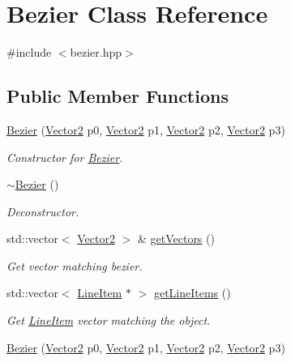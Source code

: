 \hypertarget{classBezier}{}\section{Bezier Class Reference}
\label{classBezier}


{\ttfamily \#include $<$bezier.\+hpp$>$}

\subsection*{Public Member Functions}
\begin{DoxyCompactItemize}
\item 
\mbox{\hyperlink{classBezier_aeee0e41ed64d1a61d7ac103d2300093b}{Bezier}} (\mbox{\hyperlink{classVector2}{Vector2}} p0, \mbox{\hyperlink{classVector2}{Vector2}} p1, \mbox{\hyperlink{classVector2}{Vector2}} p2, \mbox{\hyperlink{classVector2}{Vector2}} p3)
\begin{DoxyCompactList}\small\item\em Constructor for \mbox{\hyperlink{classBezier}{Bezier}}. \end{DoxyCompactList}\item 
\mbox{\hyperlink{classBezier_a32f81ea72bd31a4607b4168839ea8815}{$\sim$\+Bezier}} ()
\begin{DoxyCompactList}\small\item\em Deconstructor. \end{DoxyCompactList}\item 
std\+::vector$<$ \mbox{\hyperlink{classVector2}{Vector2}} $>$ \& \mbox{\hyperlink{classBezier_a26bf332b0c831e0f302f1d72ec782436}{get\+Vectors}} ()
\begin{DoxyCompactList}\small\item\em Get vector matching bezier. \end{DoxyCompactList}\item 
\mbox{\label{classBezier_ad4417fabe40db932edc57406d1ab302a}} 
std\+::vector$<$ \mbox{\hyperlink{classLineItem}{Line\+Item}} $\ast$ $>$ \mbox{\hyperlink{classBezier_ad4417fabe40db932edc57406d1ab302a}{get\+Line\+Items}} ()
\begin{DoxyCompactList}\small\item\em Get \mbox{\hyperlink{classLineItem}{Line\+Item}} vector matching the object. \end{DoxyCompactList}\item 
\mbox{\hyperlink{classBezier_aeee0e41ed64d1a61d7ac103d2300093b}{Bezier}} (\mbox{\hyperlink{classVector2}{Vector2}} p0, \mbox{\hyperlink{classVector2}{Vector2}} p1, \mbox{\hyperlink{classVector2}{Vector2}} p2, \mbox{\hyperlink{classVector2}{Vector2}} p3)

\end{DoxyCompactItemize}
